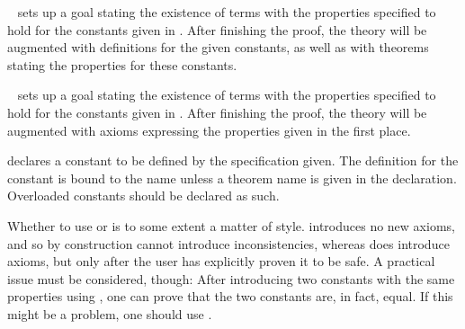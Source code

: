 \begin{isabellebody}
\begin{isamarkuptext}
  \begin{description}

  \item \hyperlink{command.HOL.specification}{\mbox{}}~ sets up a
  goal stating the existence of terms with the properties specified to
  hold for the constants given in .  After finishing the
  proof, the theory will be augmented with definitions for the given
  constants, as well as with theorems stating the properties for these
  constants.

  \item \hyperlink{command.HOL.ax-specification}{\mbox{}}~ sets up
  a goal stating the existence of terms with the properties specified
  to hold for the constants given in .  After finishing
  the proof, the theory will be augmented with axioms expressing the
  properties given in the first place.

  \item {} declares a constant to be defined by the
  specification given.  The definition for the constant  is
  bound to the name  unless a theorem name is given in
  the declaration.  Overloaded constants should be declared as such.

  \end{description}

  Whether to use \hyperlink{command.HOL.specification}{\mbox{}} or \hyperlink{command.HOL.ax-specification}{\mbox{}} is to some extent a matter of style.  \hyperlink{command.HOL.specification}{\mbox{}} introduces no new axioms, and so by
  construction cannot introduce inconsistencies, whereas \hyperlink{command.HOL.ax-specification}{\mbox{}} does introduce axioms, but only after the
  user has explicitly proven it to be safe.  A practical issue must be
  considered, though: After introducing two constants with the same
  properties using \hyperlink{command.HOL.specification}{\mbox{}}, one can prove
  that the two constants are, in fact, equal.  If this might be a
  problem, one should use \hyperlink{command.HOL.ax-specification}{\mbox{}}.%
\end{isamarkuptext}%
\isamarkuptrue%
%
\isadelimtheory
%
\endisadelimtheory
%
\isatagtheory
{}\isamarkupfalse%
%
\endisatagtheory
{\isafoldtheory}%
%
\isadelimtheory
%
\endisadelimtheory
\isanewline
\end{isabellebody}%
